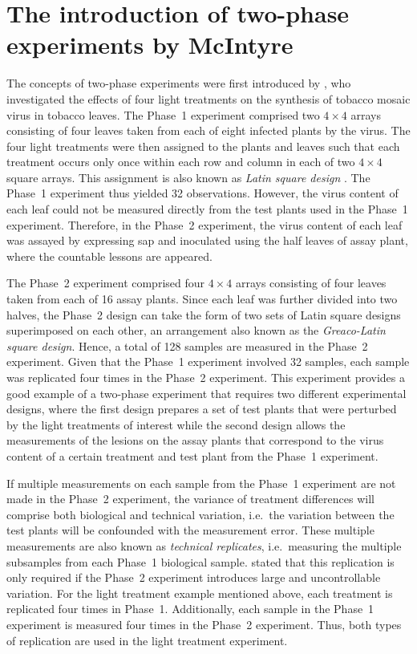 \documentclass[11pt,a4paper]{article}
\begin{document}
\section{The introduction of two-phase experiments by McIntyre}
\label{sec:introTwoPhase}
The concepts of two-phase experiments were first introduced by \cite{McIntyre1955}, who investigated the effects of four light treatments on the synthesis of tobacco mosaic virus in tobacco leaves. The Phase~1 experiment comprised two $4 \times 4$ arrays consisting of four leaves taken from each of eight infected plants by the virus. The four light treatments were then assigned to the plants and leaves such that each treatment occurs only once within each row and column in each of two $4 \times 4$ square arrays. This assignment is also known as \emph{Latin square design} \citep{Bailey2008}. The Phase~1 experiment thus yielded 32 observations. However, the virus content of each leaf could not be measured directly from the test plants used in the Phase~1 experiment. Therefore, in the Phase~2 experiment, the virus content of each leaf was assayed by expressing sap and inoculated using the half leaves of assay plant, where the countable lessons are appeared. 

The Phase~2 experiment comprised four $4 \times 4$ arrays consisting of four leaves taken from each of 16 assay plants. Since each leaf was further divided into two halves, the Phase~2 design can take the form of two sets of Latin square designs superimposed on each other, an arrangement also known as the \emph{Greaco-Latin square design}. Hence, a total of 128 samples are measured in the Phase~2 experiment. Given that the Phase~1 experiment involved 32 samples, each sample was replicated four times in the Phase~2 experiment. This experiment provides a good example of a two-phase experiment that requires two different experimental designs, where the first design prepares a set of test plants that were perturbed by the light treatments of interest while the second design allows the measurements of the lesions on the assay plants that correspond to the virus content of a certain treatment and test plant from the Phase~1 experiment. 

If multiple measurements on each sample from the Phase~1 experiment are not made in the Phase~2 experiment, the variance of treatment differences will comprise both biological and technical variation, i.e.\ the variation between the test plants will be confounded with the measurement error. These multiple measurements are also known as \emph{technical replicates}, i.e.\ measuring the multiple subsamples from each Phase~1 biological sample. \cite{McIntyre1955} stated that this replication is only required if the Phase~2 experiment introduces large and uncontrollable variation. For the light treatment example mentioned above, each treatment is replicated four times in Phase~1. Additionally, each sample in the Phase~1 experiment is measured four times in the Phase~2 experiment. Thus, both types of replication are used in the light treatment experiment. 
\end{document}
